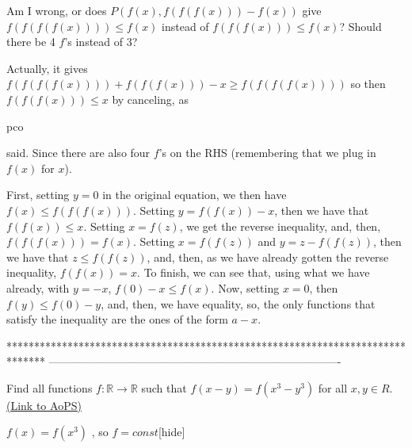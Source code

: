 \begin{solution}
	Am I wrong, or does $P(f(x), f(f(f(x)))-f(x))$ give $f(f(f(f(x))))\leq f(x)$ instead of $f(f(f(x)))\leq f(x)$?  Should there be 4 $f$'s instead of 3?
\end{solution}



\begin{solution}
	Actually, it gives $f(f(f(f(x)))) + f(f(f(x))) - x \ge f(f(f(f(x))))$ so then $f(f(f(x))) \le x$ by canceling, as \begin{bolded}pco\end{bolded} said. Since there are also four $f$'s on the RHS (remembering that we plug in $f(x)$ for $x$).
\end{solution}



\begin{solution}
	First, setting $y=0$ in the original equation, we then have $f(x)\le f(f(f(x)))$. Setting $y=f(f(x))-x$, then we have that $f(f(x))\le x$. Setting $x=f(z)$, we get the reverse inequality, and, then, $f(f(f(x)))=f(x)$. Setting $x=f(f(z))$ and $y=z-f(f(z))$, then we have that $z\le f(f(z))$, and, then, as we have already gotten the reverse inequality, $f(f(x))=x$. To finish, we can see that, using what we have already, with $y=-x$, $f(0)-x\le f(x)$. 
Now, setting $x=0$, then $f(y)\le f(0)-y$, and, then, we have equality, so, the only functions that satisfy the inequality are the ones of the form $a-x$.
\end{solution}
*******************************************************************************
-------------------------------------------------------------------------------

\begin{problem}
	Find all functions $f: \mathbb{R}\to\mathbb{R}$ such that $f(x-y)=f(x^3-y^3)$ for all $x,y{\in}R$.
	\flushright \href{https://artofproblemsolving.com/community/c6h565300}{(Link to AoPS)}
\end{problem}



\begin{solution}$f(x)=f(x^3)$ , so $f=const$[\/hide]
\end{solution}



